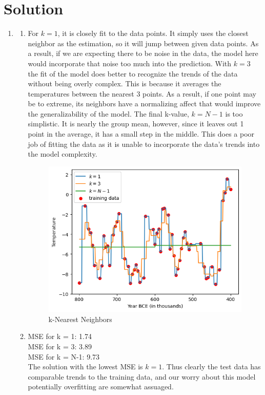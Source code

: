 \documentclass[submit]{harvardml}
\newenvironment{solution}
  {\color{blue}\section*{Solution}}
{}
\begin{document}
\newpage
\begin{solution}

\begin{enumerate}
    \item \begin{enumerate}
        \item For $k=1$, it is closely fit to the data points. It simply uses the closest neighbor as the estimation, so it will jump between given data points. As a result, if we are expecting there to be noise in the data, the model here would incorporate that noise too much into the prediction. With $k=3$ the fit of the model does better to recognize the trends of the data without being overly complex. This is because it averages the temperatures between the nearest 3 points. As a result, if one point may be to extreme, its neighbors have a normalizing affect that would improve the generalizability of the model. The final k-value, $k=N-1$ is too simplistic. It is nearly the group mean, however, since it leaves out 1 point in the average, it has a small step in the middle. This does a poor job of fitting the data as it is unable to incorporate the data's trends into the model complexity. 
        \begin{figure}[htp]
            \centering
            \includegraphics[width=0.5\linewidth]{img_output/p1.1a.png}
            \caption{k-Nearest Neighbors}
            \label{fig:enter-label}
        \end{figure}

        \item 
        MSE for k = 1: 1.74
        \\MSE for k = 3: 3.89
        \\MSE for k = N-1: 9.73
        \\ The solution with the lowest MSE is $k=1$. Thus clearly the test data has comparable trends to the training data, and our worry about this model potentially overfitting are somewhat assuaged. 
        
    \end{enumerate}


\end{enumerate}
\end{solution}
\end{document}
